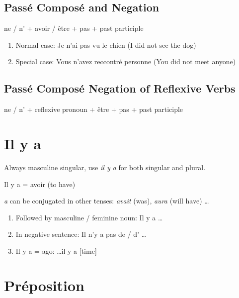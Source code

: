 \documentclass{book}
\begin{document}
    \section{Passé Composé and Negation}
        \begin{center}
            ne / n' + avoir / être + pas + past participle
        \end{center}
        \begin{enumerate}
            \item Normal case: Je n'ai pas vu le chien (I did not see the dog)
            \item Special case: Vous n'avez reccontré personne (You did not meet anyone)
        \end{enumerate}

    \section{Passé Composé Negation of Reflexive Verbs}
        \begin{center}
            ne / n' + reflexive pronoun + être + pas + past participle
        \end{center}
    
\chapter{Il y a}
    Always masculine singular, use \textit{il y a} for both singular and plural.
    \begin{center}
        Il y a = avoir (to have)
    \end{center}
    \textit{a} can be conjugated in other tenses: \textit{avait} (was), \textit{aura} (will have) \dots
    \begin{enumerate}
        \item Followed by masculine / feminine noun: Il y a \dots
        \item In negative sentence: Il n'y a pas de / d' \dots
        \item Il y a = ago: \dots il y a [time]
    \end{enumerate}

\chapter{Préposition}
\end{document}

